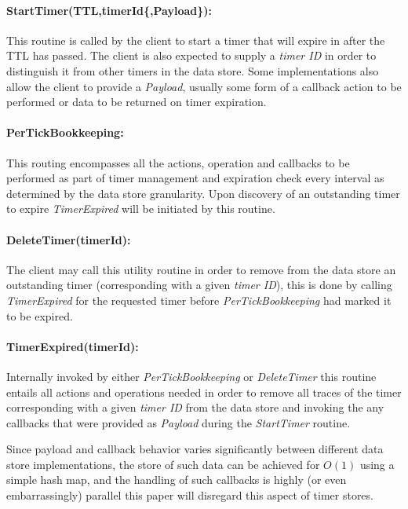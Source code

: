 \documentclass[twocolumn,a4paper]{article}
\begin{document}
\paragraph{StartTimer(TTL,timerId\{,Payload\}):} This routine is called by the client to start a timer that will expire in after the TTL has passed. The client is also expected to supply a \textit{timer ID} in order to distinguish it from other timers in the data store. Some implementations also allow the client to provide a \textit{Payload}, usually some form of a callback action to be performed or data to be returned on timer expiration.

\paragraph{PerTickBookkeeping:} This routing encompasses all the actions, operation and callbacks to be performed as part of timer management and  expiration check every interval as determined by the data store granularity. Upon discovery of an outstanding timer to expire \textit{TimerExpired} will be initiated by this routine.

\paragraph{DeleteTimer(timerId):} The client may call this utility routine in order to remove from the data store an outstanding timer (corresponding with a given \textit{timer ID}), this is done by calling \textit{TimerExpired} for the requested timer before \textit{PerTickBookkeeping} had marked it to be expired.

\paragraph{TimerExpired(timerId):} Internally invoked by either \textit{PerTickBookkeeping} or \textit{DeleteTimer} this routine entails all actions and operations needed in order to remove all traces of the timer corresponding with a given \textit{timer ID} from the data store and invoking the any callbacks that were provided as \textit{Payload} during the \textit{StartTimer} routine.

\vspace{5mm}

Since payload and callback behavior varies significantly between different data store implementations, the store of such data can be achieved for $ O(1) $ using a simple hash map, and the handling of such callbacks is highly (or even embarrassingly) parallel this paper will disregard this aspect of timer stores.
\end{document}
